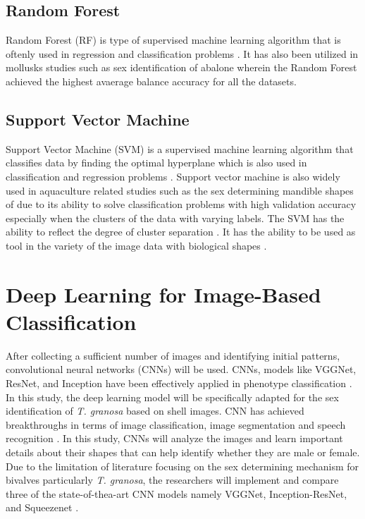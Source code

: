 \subsection{Random Forest}

Random Forest (RF) is type of supervised machine learning algorithm that is oftenly used in regression and classification problems \cite{cui2020}. It has also been utilized in mollusks studies such as sex identification of abalone wherein the Random Forest achieved the highest avaerage balance accuracy for all the datasets\cite{arifin2021}.

\subsection{Support Vector Machine}

Support Vector Machine (SVM) is a supervised machine learning algorithm that classifies data by finding the optimal hyperplane which is also used in classification and regression problems \cite{cui2020}. Support vector machine is also widely used in aquaculture related studies such as the sex determining mandible shapes of due to its ability to solve classification problems with high validation accuracy especially when the clusters of the data with varying labels. The SVM has the ability to reflect the degree of cluster separation . It has the ability to be used as tool in the variety of the image data with biological shapes \cite{tsutsumi2023}.


\section{ Deep Learning for Image-Based Classification}
\label{sec:deeplearning}
After collecting a sufficient number of images and identifying initial patterns, convolutional neural networks (CNNs) will be used. CNNs, models like VGGNet, ResNet, and Inception have been effectively applied in phenotype classification \cite{kim2024}. In this study, the deep learning model will be specifically adapted for the sex identification of \textit{T. granosa} based on shell images. CNN has achieved breakthroughs in terms of image classification, image segmentation and speech recognition \cite{he2018}. In this study, CNNs will analyze the images and learn important details about their shapes that can help identify whether they are male or female. Due to the limitation of literature focusing on the sex determining mechanism for bivalves particularly \textit{T. granosa}, the researchers will implement and compare three of the state-of-thea-art CNN models namely VGGNet, Inception-ResNet, and Squeezenet . 


